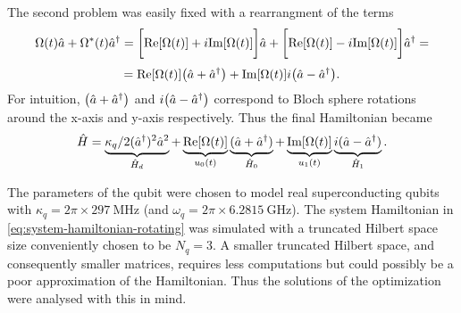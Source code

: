 \documentclass[main.tex]{subfiles}
\begin{document}
The second problem was easily fixed with a rearrangment of the terms
\[ \Omega(t)\hat{a} + \Omega^*(t)\hat{a}^\dagger = \bigg[\text{Re}\qty[\Omega(t)]+i\text{Im}\qty[\Omega(t)]\bigg]\hat{a} + \bigg[\text{Re}\qty[\Omega(t)]-i\text{Im}\qty[\Omega(t)]\bigg]\hat{a}^\dagger = \]
\[ = \text{Re}\qty[\Omega(t)]\qty(\hat{a} + \hat{a}^\dagger) + \text{Im}\qty[\Omega(t)]i\qty(\hat{a} - \hat{a}^\dagger). \]
For intuition, \( \qty(\hat{a} + \hat{a}^\dagger) \) and \( i\qty(\hat{a} - \hat{a}^\dagger) \) correspond to Bloch sphere rotations around the x-axis and y-axis respectively. 
Thus the final Hamiltonian became
\begin{equation}
    \hat{H} = \underbrace{\kappa_q/2(\hat{a}^\dagger)^2\hat{a}^2}_{\hat{H}_d} + \underbrace{\text{Re}\qty[\Omega(t)]}_{u_0(t)}\underbrace{(\hat{a} + \hat{a}^\dagger)}_{\hat{H}_0} + \underbrace{\text{Im}\qty[\Omega(t)]}_{u_1(t)}\underbrace{i(\hat{a} - \hat{a}^\dagger)}_{\hat{H}_1} .
    \label{eq:system-hamiltonian-rotating}
\end{equation}

The parameters of the qubit were chosen to model real superconducting qubits with \( \kappa_q = 2\pi\times\SI{297}{\mega\hertz} \) (and \( \omega_{q} = 2\pi\times\SI{6.2815}{\giga\hertz} \)).
The system Hamiltonian in \cref{eq:system-hamiltonian-rotating} was simulated with a truncated Hilbert space size conveniently chosen to be \( N_q = 3 \).
A smaller truncated Hilbert space, and consequently smaller matrices, requires less computations but could possibly be a poor approximation of the Hamiltonian.
Thus the solutions of the optimization were analysed with this in mind.
\end{document}
